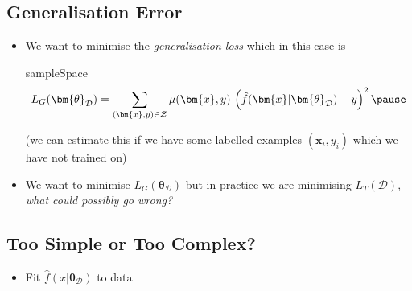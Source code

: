 
\begin{slide}
\section{Generalisation Error}

\begin{PauseHighLight}
  \begin{itemize}
  \item We want to minimise the \textit{generalisation loss} which in
    this case is
    
    \begin{rightImage}{sampleSpace}
      \begin{align*}
        L_G(\bm{\theta}_{\mathcal{D}}) = \sum_{(\bm{x},y)\in\mathcal{Z}} \mu(\bm{x},y)\,
        \left(\hat{f}(\bm{x}\vert \bm{\theta}_\mathcal{D}) - y
        \right)^2\pause 
      \end{align*}
    \end{rightImage}

    (we can estimate this if we have some labelled examples
    $(\bm{x}_i,y_i)$ which we have not trained on)\pause
  \item We want to minimise $L_G(\bm{\theta}_{\mathcal{D}})$ but in practice we are
    minimising $L_T(\mathcal{D})$, \textit{what could possibly go wrong?}\pause
  \end{itemize}
\end{PauseHighLight}

\end{slide}


\begin{slide}
\section[-2]{Too Simple or Too Complex?}

\pb
\hypertarget{regression}{}

\begin{itemize}
\item Fit $\hat{f}(x|\bm{\theta}_\mathcal{D})$ to data\pauseh
  \begin{center}
    \pause
  \end{center}
\end{itemize}

\end{slide}



